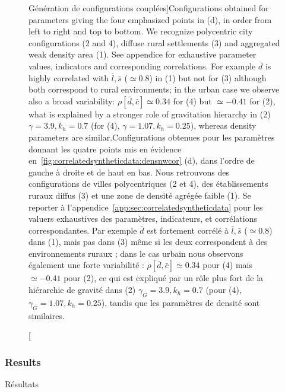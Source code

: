 \begin{figure}
\caption[Examples of generated coupled configurations][Génération de configurations couplées]{Configurations obtained for parameters giving the four emphasized points in (d), in order from left to right and top to bottom. We recognize polycentric city configurations (2 and 4), diffuse rural settlements (3) and aggregated weak density area (1). See appendice for exhaustive parameter values, indicators and corresponding correlations. For example $\bar{d}$ is highly correlated with $\bar{l},\bar{s}$ ($\simeq$0.8) in (1) but not for (3) although both correspond to rural environments; in the urban case we observe also a broad variability: $\rho[\bar{d},\bar{c}]\simeq 0.34$ for (4) but $\simeq-0.41$ for (2), what is explained by a stronger role of gravitation hierarchy in (2) $\gamma=3.9,k_h=0.7$ (for (4), $\gamma=1.07,k_h=0.25$), whereas density parameters are similar.\label{fig:correlatedsyntheticdata:example}}{Configurations obtenues pour les paramètres donnant les quatre points mis en évidence en~\ref{fig:correlatedsyntheticdata:densnwcor} (d), dans l'ordre de gauche à droite et de haut en bas. Nous retrouvons des configurations de villes polycentriques (2 et 4), des établissements ruraux diffus (3) et une zone de densité agrégée faible (1). Se reporter à l'appendice~\ref{app:sec:correlatedsyntheticdata} pour les valuers exhaustives des paramètres, indicateurs, et corrélations correspondantes. Par exemple $\bar{d}$ est fortement corrélé à $\bar{l},\bar{s}$ ($\simeq$0.8) dans (1), mais pas dans (3) même si les deux correspondent à des environnements ruraux ; dans le cas urbain nous observons également une forte variabilité : $\rho[\bar{d},\bar{c}]\simeq 0.34$ pour (4) mais $\simeq-0.41$ pour (2), ce qui est expliqué par un rôle plus fort de la hiérarchie de gravité dans (2) $\gamma_G=3.9,k_h=0.7$ (pour (4), $\gamma_G=1.07,k_h=0.25$), tandis que les paramètres de densité sont similaires.\label{fig:correlatedsyntheticdata:example}}
\end{figure}





\subsubsection{Results}{Résultats}


